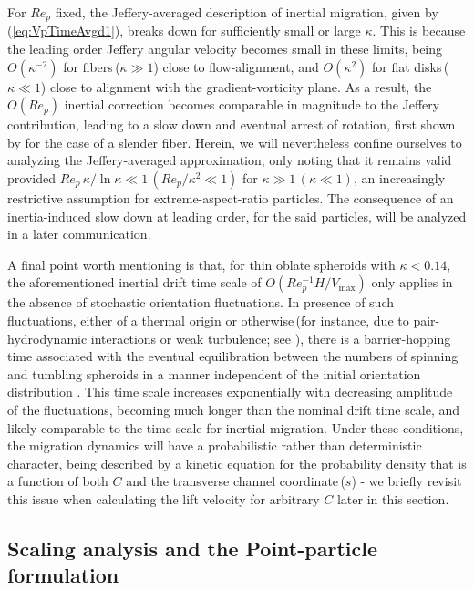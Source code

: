 \documentclass{jfm}
\begin{document}
For $Re_p$ fixed, the Jeffery-averaged description of inertial migration, given by  (\ref{eq:VpTimeAvgd1}), breaks down for sufficiently small or large $\kappa$. This is because the leading order Jeffery angular velocity becomes small in these limits, being $O(\kappa^{-2})$ for fibers\,($\kappa \gg 1$) close to flow-alignment, and $O(\kappa^2)$ for flat disks\,($\kappa \ll 1$) close to alignment with the gradient-vorticity plane. As a result, the $O(Re_p)$ inertial correction becomes comparable in magnitude to the Jeffery contribution, leading to a slow down and eventual arrest of rotation, first shown by \cite{subkoch2005} for the case of a slender fiber. Herein, we will nevertheless confine ourselves to analyzing the Jeffery-averaged approximation, only noting that it remains valid provided $Re_p\,\kappa/\ln \kappa \ll 1\,(Re_p/\kappa^2 \ll 1)$ for $\kappa \gg 1\,(\kappa \ll 1)$, an increasingly restrictive assumption for extreme-aspect-ratio particles\citep{subkoch2005,navaneeth2017}. The consequence of an inertia-induced slow down at leading order, for the said particles, will be analyzed in a later communication.

A final point worth mentioning is that, for thin oblate spheroids with $\kappa < 0.14$, the aforementioned inertial drift time scale of $O(Re_p^{-1}H/V_\text{max})$ only applies in the absence of stochastic orientation fluctuations. In presence of such fluctuations, either of a thermal origin or otherwise\,(for instance, due to pair-hydrodynamic interactions or weak turbulence; see \cite{subramanian2022}), there is a barrier-hopping time associated with the eventual equilibration between the numbers of spinning and tumbling spheroids in a manner independent of the initial orientation distribution \citep{navaneeth2016,navaneethRapids,marath2018}. This time scale increases exponentially with decreasing amplitude of the fluctuations, becoming much longer than the nominal drift time scale, and likely  comparable to the time scale for inertial migration. Under these conditions, the migration dynamics will have a probabilistic rather than deterministic character, being described by a kinetic equation for the probability density that is a function of both $C$ and the transverse channel coordinate\,($s$) - we briefly revisit this issue when calculating the lift velocity for arbitrary $C$ later in this section.

\subsection{Scaling analysis and the Point-particle formulation} \label{sec:Ch3Scaling}
\end{document}
